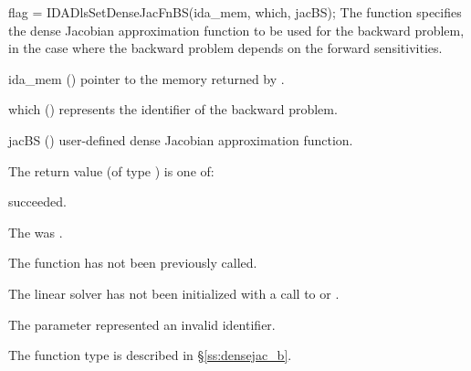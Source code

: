 {
  flag = IDADlsSetDenseJacFnBS(ida\_mem, which, jacBS);
}
{
  The function  specifies the dense Jacobian
  approximation function to be used for the backward problem, in the case
  where the backward problem depends on the forward sensitivities.
}
{
  \begin{args}
  \item[ida\_mem] ()
    pointer to the {\idas} memory returned by .
  \item[which] ()
    represents the identifier of the backward problem.
  \item[jacBS] ()
    user-defined dense Jacobian approximation function.
  \end{args}
}
{
  The return value  (of type ) is one of:
  \begin{args}
  \item[\Id{IDADLS\_SUCCESS}] 
     succeeded.
  \item[\Id{IDADLS\_MEM\_NULL}]
    The  was .
  \item[\Id{IDADLS\_NO\_ADJ}]
    The function  has not been previously called.
  \item[\Id{IDADLS\_LMEM\_NULL}]
    The linear solver has not been initialized with a call to 
    or .
  \item[\Id{IDADLS\_ILL\_INPUT}]
    The parameter  represented an invalid identifier.
  \end{args}
}
{
  The function type  is described in \S\ref{ss:densejac_b}.
}


